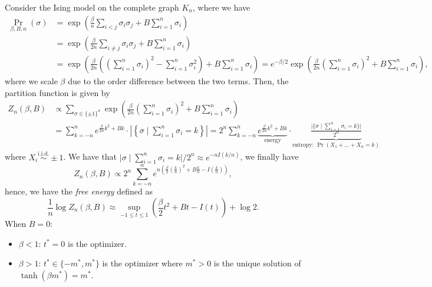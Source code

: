 \begin{eg}
	Consider the Ising model on the complete graph \(K_n\), where we have
	\[
		\begin{split}
			\Pr_{\beta , B, n}\left(\sigma \right)
			 & = \exp (\frac{\beta }{n} \sum_{i < j} \sigma _i \sigma _j + B \sum_{i=1}^{n} \sigma _i)                                                         \\
			 & = \exp (\frac{\beta }{2n} \sum_{i \neq j} \sigma _i \sigma _j + B \sum_{i=1}^{n} \sigma _i )                                                    \\
			 & = \exp (\frac{\beta }{2n} \left( \left( \sum_{i=1}^{n} \sigma _i \right) ^2 - \sum_{i=1}^{n} \sigma _i^2 \right) + B \sum_{i=1}^{n} \sigma _i )
			= e^{-\beta / 2} \exp (\frac{\beta }{2n} \left( \sum_{i=1}^{n} \sigma _i \right) ^2 + B \sum_{i=1}^{n} \sigma _i),
		\end{split}
	\]
	where we scale \(\beta \) due to the order difference between the two terms. Then, the partition function is given by
	\[
		\begin{split}
			Z_n(\beta , B)
			 & \propto \sum_{\sigma \in \{ \pm 1 \} ^n} \exp (\frac{\beta }{2n} \left( \sum_{i=1}^{n} \sigma _i \right) ^2 + B \sum_{i=1}^{n} \sigma _i ) \\
			 & = \sum_{k=-n}^{n} e^{\frac{\beta }{2n} k^2 + Bk} \cdot \left\lvert \left\{ \sigma \mid \sum_{i=1}^{n} \sigma _i = k \right\} \right\rvert
			= 2^n \sum_{k=-n}^{n} \underbrace{e^{\frac{\beta }{2n} k^2 + Bk}}_{\text{energy} } \cdot \underbrace{\frac{\lvert \{ \sigma \mid \sum_{i=1}^{n} \sigma _i = k \}  \rvert }{2^n}}_{\text{entropy: } \Pr_{}\left(X_1 + \dots + X_n = k\right) }
		\end{split}
	\]
	where \(X_i \overset{\text{i.i.d.} }{\sim } \pm 1\). We have that \(\lvert \sigma \mid \sum_{i=1}^{n} \sigma _i = k \rvert / 2^n \approx e^{-n I(k / n)}\), we finally have
	\[
		Z_n(\beta , B)
		\propto 2^n \sum_{k=-n}^{n} e^{n \left( \frac{\beta }{2}\left( \frac{k}{n} \right) ^2 + B \frac{k}{n} - I(\frac{k}{n}) \right) },
	\]
	hence, we have the \emph{free energy} defined as
	\[
		\frac{1}{n} \log Z_n(\beta , B)
		\approx \sup _{-1 \leq t \leq 1} \left( \frac{\beta}{2} t^2 + Bt - I(t) \right) + \log 2.
	\]
	When \(B = 0\):
	\begin{itemize}
		\item \(\beta < 1\): \(t^{\ast} = 0\) is the optimizer.
		\item \(\beta > 1\): \(t^{\ast} \in \{ -m^{\ast} , m^{\ast} \} \) is the optimizer where \(m^{\ast} > 0\) is the unique solution of \(\tanh (\beta m^{\ast} ) = m^{\ast} \).
	\end{itemize}
\end{eg}

